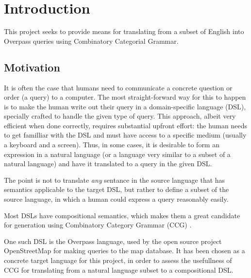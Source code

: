 \documentclass[main.tex]{subfiles}
\begin{document}
\section{Introduction}
This project seeks to provide means for translating from a subset of English
into Overpass queries using Combinatory Categorial Grammar.

\subsection{Motivation}
It is often the case that humans need to communicate a concrete question
or order (a query) to a computer. The most straight-forward way for this to happen is
to make the human write out their query in a domain-specific language (DSL),
specially crafted to handle the given type of query. This approach, albeit
very efficient when done correctly, requires substantial upfront effort:
the human needs to get familliar with the DSL and must have access to a specific
medium (usually a keyboard and a screen). Thus, in some cases, it is desirable
to form an expression in a natural language (or a language very similar to a
subset of a natural language) and have it translated to a query in the given
DSL.

The point is not to translate \emph{any} sentance in the source language
that has semantics applicable to the target DSL, but rather to define a
subset of the source language, in which a human could express a query
reasonably easily.

Most DSLs have compositional semantics, which makes them a great candidate
for generation using Combinatory Category Grammar (CCG) \cite[p.~181]{nts}.

One such DSL is the Overpass language, used by the open source project
OpenStreetMap for making queries to the map database. It has been chosen as
a concrete target language for this project, in order to assess the usefullness
of CCG for translating from a natural language subset to a compositional
DSL.
\end{document}
